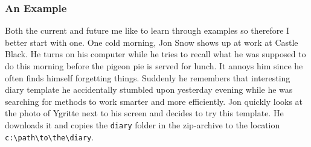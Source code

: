 \subsubsection*{An Example}
Both the current and future me like to learn through examples so therefore I better start with one. One cold morning, Jon Snow shows up at work at Castle Black. He turns on his computer while he tries to recall what he was supposed to do this morning before the pigeon pie is served for lunch. It annoys him since he often finds himself forgetting things. Suddenly he remembers that interesting diary template he accidentally stumbled upon yesterday evening while he was searching for methods to work smarter and more efficiently. Jon quickly looks at the photo of Ygritte next to his screen and decides to try this template. He downloads it and copies the {\tt diary} folder in the zip-archive to the location {\tt c:\textbackslash path\textbackslash to\textbackslash the\textbackslash diary}.

